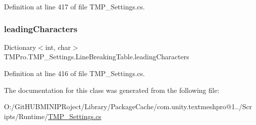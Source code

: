 Definition at line 417 of file T\+M\+P\+\_\+\+Settings.\+cs.

\mbox{\label{class_t_m_pro_1_1_t_m_p___settings_1_1_line_breaking_table_aae76391a112640f9c636a504ada45dd8}} 
\subsubsection{\texorpdfstring{leadingCharacters}{leadingCharacters}}
{\footnotesize\ttfamily Dictionary$<$int, char$>$ T\+M\+Pro.\+T\+M\+P\+\_\+\+Settings.\+Line\+Breaking\+Table.\+leading\+Characters}



Definition at line 416 of file T\+M\+P\+\_\+\+Settings.\+cs.



The documentation for this class was generated from the following file\+:\begin{DoxyCompactItemize}
\item 
O\+:/\+Git\+H\+U\+B\+M\+I\+N\+I\+P\+Roject/\+Library/\+Package\+Cache/com.\+unity.\+textmeshpro@1../\+Scripts/\+Runtime/\mbox{\hyperlink{_t_m_p___settings_8cs}{T\+M\+P\+\_\+\+Settings.\+cs}}\end{DoxyCompactItemize}
